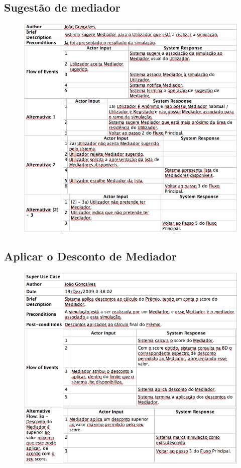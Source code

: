 \pagebreak

\subsection{Sugestão de mediador}
\begin{figure}[!htb]
	\centering
	\includegraphics[scale=0.72]{images/Prints/RealizacaoSeguroAutomovel/SugerirMediador.png}
\end{figure}

\pagebreak

\subsection{Aplicar o Desconto de Mediador}
\begin{figure}[!htb]
	\centering
	\includegraphics[scale=0.69]{images/Prints/RealizacaoSeguroAutomovel/AplicarDescontosMediador.png}
\end{figure}

